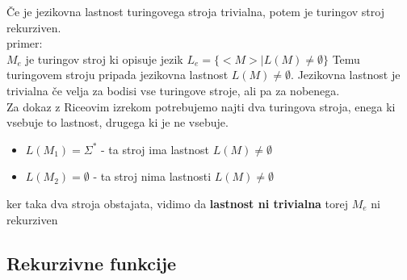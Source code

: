 \documentclass[a4paper]{article}
\begin{document}
\begin{multicols}{2}
Če je jezikovna lastnost turingovega stroja trivialna, potem je turingov stroj rekurziven.\\
primer:\\
$M_e$ je turingov stroj ki opisuje jezik $L_e = \lbrace <M> | L(M) \neq \emptyset \rbrace $
Temu turingovem stroju pripada jezikovna lastnost $ L(M) \neq \emptyset $. 
Jezikovna lastnost je trivialna če velja za bodisi vse turingove stroje, ali pa za nobenega.\\

Za dokaz z Riceovim izrekom potrebujemo najti dva turingova stroja, enega ki vsebuje to lastnost, drugega ki je ne vsebuje.
\begin{itemize}
\item $L(M_1) = \Sigma^*$ - ta stroj ima lastnost $ L(M) \neq \emptyset $
\item $L(M_2) = \emptyset $ - ta stroj nima lastnosti $ L(M) \neq \emptyset $
\end{itemize}
ker taka dva stroja obstajata, vidimo da \textbf{lastnost ni trivialna} torej $M_e$ ni rekurziven

\subsection*{Rekurzivne funkcije}
\begin{enumerate}


\end{enumerate}
\end{multicols}
\end{document}
